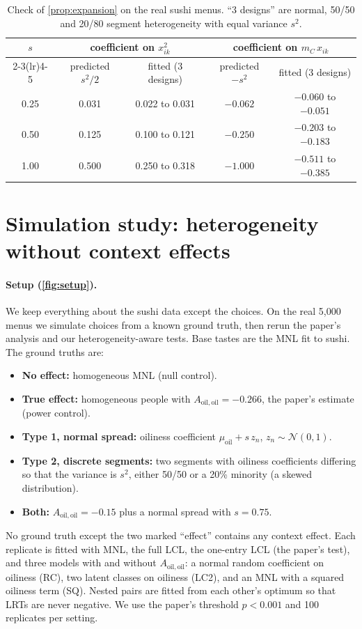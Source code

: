 \documentclass[11pt,a4paper]{article}
\theoremstyle{remark}
\newcommand{\Aoo}{A_{\mathrm{oil,oil}}}
\begin{document}
\begin{table}[!htbp]
\centering\small
\begin{tabular}{ccccc}
\toprule
$s$ & \multicolumn{2}{c}{coefficient on $x_{ik}^2$} & \multicolumn{2}{c}{coefficient on $m_C\,x_{ik}$}\\
\cmidrule(lr){2-3}\cmidrule(lr){4-5}
 & predicted $s^2/2$ & fitted (3 designs) & predicted $-s^2$ & fitted (3 designs)\\
\midrule
0.25 & 0.031 & 0.022 to 0.031 & $-0.062$ & $-0.060$ to $-0.051$\\
0.50 & 0.125 & 0.100 to 0.121 & $-0.250$ & $-0.203$ to $-0.183$\\
1.00 & 0.500 & 0.250 to 0.318 & $-1.000$ & $-0.511$ to $-0.385$\\
\bottomrule
\end{tabular}
\caption{Check of \cref{prop:expansion} on the real sushi menus. ``3 designs'' are normal, 50/50 and
20/80 segment heterogeneity with equal variance $s^2$.}
\label{tab:oracle}
\end{table}

\section{Simulation study: heterogeneity without context effects}
\label{sec:sim}

\paragraph{Setup (\cref{fig:setup}).}
We keep everything about the sushi data except the choices. On the real 5{,}000 menus we simulate
choices from a known ground truth, then rerun the paper's analysis and our heterogeneity-aware tests.
Base tastes are the MNL fit to sushi. The ground truths are:
\begin{itemize}
\item \textbf{No effect:} homogeneous MNL (null control).
\item \textbf{True effect:} homogeneous people with $\Aoo=-0.266$, the paper's estimate (power control).
\item \textbf{Type 1, normal spread:} oiliness coefficient $\mu_{\mathrm{oil}}+s\,z_n$, $z_n\sim\mathcal N(0,1)$.
\item \textbf{Type 2, discrete segments:} two segments with oiliness coefficients differing so that the
      variance is $s^2$, either 50/50 or a 20\% minority (a skewed distribution).
\item \textbf{Both:} $\Aoo=-0.15$ plus a normal spread with $s=0.75$.
\end{itemize}
No ground truth except the two marked ``effect'' contains any context effect. Each replicate is fitted with
MNL, the full LCL, the one-entry LCL (the paper's test), and three models with and without $\Aoo$: a
normal random coefficient on oiliness (RC), two latent classes on oiliness (LC2), and an MNL with a
squared oiliness term (SQ). Nested pairs are fitted from each other's optimum so that LRTs are never
negative. We use the paper's threshold $p<0.001$ and 100 replicates per setting.
\end{document}
